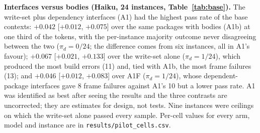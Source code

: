 \documentclass[10pt]{article}
\begin{document}
\textbf{Interfaces versus bodies (Haiku, 24 instances, Table~\ref{tab:base}).} The write-set plus dependency interfaces (A1) had the highest pass rate of the base contexts: $+0.042$ [$+0.012$, $+0.075$] over the same packages with bodies (A1b) at one third of the tokens, with the per-instance majority outcome never disagreeing between the two ($\pi_d = 0/24$; the difference comes from six instances, all in A1's favour); $+0.067$ [$+0.021$, $+0.133$] over the write-set alone ($\pi_d = 1/24$), which produced the most build errors (11) and, tied with A1b, the most frame failures (13); and $+0.046$ [$+0.012$, $+0.083$] over A1F ($\pi_d = 1/24$), whose dependent-package interfaces gave 8 frame failures against A1's 10 but a lower pass rate. A1 was identified as best after seeing the results and the three contrasts are uncorrected; they are estimates for design, not tests. Nine instances were ceilings on which the write-set alone passed every sample. Per-cell values for every arm, model and instance are in \texttt{results/pilot\_cells.csv}.

\begin{table}[t]
\centering\small
{}
\caption{Base arms, Claude Haiku 5.5, 24 instances, 10 samples per cell. Counts are over 240 samples per arm.}
\label{tab:base}
\end{table}
\end{document}
